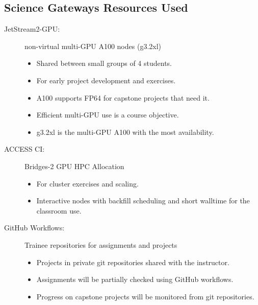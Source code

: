 \documentclass{article}
\newcommand{\sectionbox}[1]{%
  \begin{tcolorbox}[sharp corners,boxrule=0pt,colback=fh-blue,coltext=fh-gold]%
    \section*{#1\vphantom{Yy}}%
  \end{tcolorbox}%
}
\begin{document}
\begin{multicols}{2}
  \sectionbox{Science Gateways Resources Used}%
  \begin{description}
  \item[JetStream2-GPU:] non-virtual multi-GPU A100 nodes (g3.2xl)
    \begin{itemize}
    \item Shared between small groups of 4 students.
    \item For early project development and exercises.
    \item A100 supports FP64 for capstone projects that need it.
    \item Efficient multi-GPU use is a course objective.
    \item g3.2xl is the multi-GPU A100 with the most availability.
    \end{itemize}
  \item[ACCESS CI:] Bridges-2 GPU HPC Allocation
    \begin{itemize}
    \item For cluster exercises and scaling.
    \item Interactive nodes with backfill scheduling and short walltime %
    for the classroom use.
    \end{itemize}
  \item[GitHub Workflows:] Trainee repositories for assignments and projects
    \begin{itemize}
    \item Projects in private git repositories shared with the instructor.
    \item Assignments will be partially checked using GitHub workflows.
    \item Progress on capstone projects will be monitored from git repositories.
    \end{itemize}
  \end{description}


\end{multicols}
\end{document}
